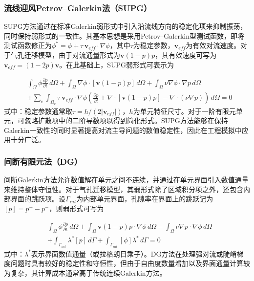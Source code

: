 \subsubsection{流线迎风Petrov--Galerkin法（SUPG）}

SUPG方法\cite{brooksStreamlineUpwindPetrovgalerkin1982,johnsonFiniteElementMethods1984}通过在标准Galerkin弱形式中引入沿流线方向的稳定化项来抑制振荡，同时保持弱形式的一致性。其基本思想是采用Petrov--Galerkin型测试函数，即将测试函数修正为$\phi^*=\phi+\tau\,\mathbf v_{eff}\cdot\nabla\phi$，其中$\tau$为稳定参数，$\mathbf v_{eff}$为有效对流速度。对于气孔迁移模型，由于对流通量形式为$\mathbf v(1-p)p$，其有效速度可写为$\mathbf v_{eff}=(1-2p)\mathbf v$。在此基础上，SUPG弱形式可表示为

\begin{equation}
	\begin{aligned}
		&
		\int_\Omega
		\phi
		\frac{\partial p}{\partial t}
		\,d\Omega
		+
		\int_\Omega
		\nabla\phi\cdot[\mathbf v(1-p)p]
		\,d\Omega
		+
		\int_\Omega
		\nu\nabla\phi\cdot\nabla p
		\,d\Omega
		\\
		&
		+
		\sum_e
		\int_{\Omega_e}
		\tau\,\mathbf v_{eff}\cdot\nabla\phi
		\left(
		\frac{\partial p}{\partial t}
		+
		\nabla\cdot[\mathbf v(1-p)p]
		-
		\nabla\cdot(\nu\nabla p)
		\right)
		\,d\Omega
		=0 
	\end{aligned}
	\label{eq:supg_weak}
\end{equation}
式中：稳定参数通常取$\tau=h/(2|\mathbf v_{eff}|)$，$h$为单元特征尺寸。对于一阶有限元单元，可忽略扩散项中的二阶导数项以得到简化形式。SUPG方法能够在保持Galerkin一致性的同时显著提高对流主导问题的数值稳定性，因此在工程模拟中应用十分广泛。

\subsubsection{间断有限元法（DG）}

间断Galerkin方法允许数值解在单元之间不连续，并通过在单元界面引入数值通量来维持整体守恒性\cite{shuonanStabilizedFiniteElement2024}。对于气孔迁移模型，其弱形式除了区域积分项之外，还包含内部界面的跳跃项。设$\Gamma_{int}$为内部单元界面，孔隙率在界面上的跳跃记为$[p]=p^+-p^-$，则弱形式可写为

\begin{equation}
	\begin{aligned}
		&
		\int_\Omega
		\phi
		\frac{\partial p}{\partial t}
		\,d\Omega
		+
		\int_\Omega
		\mathbf v(1-p)p\cdot\nabla\phi
		\,d\Omega
		-
		\int_\Omega
		\nu\nabla p\cdot\nabla\phi
		\,d\Omega
		\\
		&
		+
		\int_{\Gamma_{int}}
		\lambda^*[p]\,d\Gamma
		+
		\int_{\Gamma_{int}}
		[\phi]\lambda^*\,d\Gamma
		=0 
	\end{aligned}
	\label{eq:dg_weak}
\end{equation}
式中：$\lambda^*$表示界面数值通量（或拉格朗日乘子）。DG方法在处理强对流或陡峭梯度问题时具有较好的稳定性和守恒性，但由于自由度数量增加以及界面通量计算较为复杂，其计算成本通常高于传统连续Galerkin方法。

